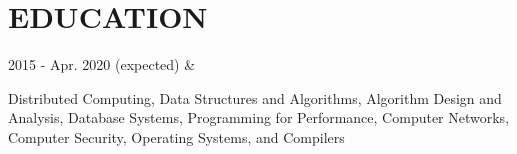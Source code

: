 \documentclass[]{richard-dang}
\begin{document}
\section*{EDUCATION}
\medbreak
\begin{tabularcv}
    2015 - \newline 
    Apr. 2020 (expected)   &   
                    \begin{tabitemize}
                        \item Distributed Computing, Data Structures and Algorithms, Algorithm Design and Analysis, Database Systems, Programming for Performance, Computer Networks, Computer Security, Operating Systems, and Compilers 
                    \end{tabitemize} 

\end{tabularcv}
\end{document}
